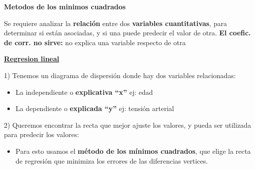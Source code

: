 \documentclass[10pt,a4paper]{article}
\begin{document}
\shorthandoff{<>}

\begin{center}
{\large\bfseries Metodos de los minimos cuadrados}
\end{center}
\vspace{-2pt}

Se requiere analizar la \textbf{relación} entre dos \textbf{variables cuantitativas}, para determinar si están asociadas, y si una puede predecir el valor de otra.
\textbf{El coefic. de corr. no sirve:} no explica una variable respecto de otra

\textbf{\uline{Regresion lineal}}

1) Tenemos un diagrama de dispersión donde hay dos variables relacionadas:
\begin{itemize}[leftmargin=16pt,itemsep=0pt,topsep=1pt,parsep=0pt]
  \item La independiente o \textbf{explicativa ``x''} \quad ej: edad
  \item La dependiente o \textbf{explicada ``y''} \qquad ej: tensión arterial
\end{itemize}

2) Queremos encontrar la recta que mejor ajuste los valores, y pueda ser utilizada para predecir los valores:
\begin{itemize}[leftmargin=16pt,itemsep=0pt,topsep=1pt,parsep=0pt]
  \item Para esto usamos el \textbf{método de los mínimos cuadrados}, que elige la recta de regresión que minimiza los errores de las diferencias vertices.
\end{itemize}
\end{document}
